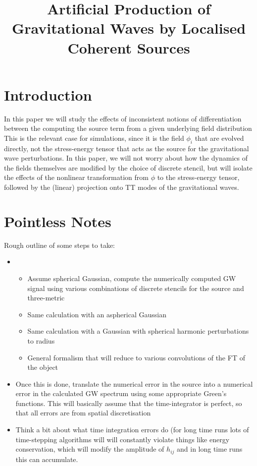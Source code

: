 \documentclass{revtex4}
\title{Artificial Production of Gravitational Waves by Localised Coherent Sources}
\begin{document}
\maketitle

\section{Introduction}
In this paper we will study the effects of inconsistent notions of differentiation between the computing the source term from a given underlying field distribution
This is the relevant case for simulations, since it is the field $\phi_i$ that are evolved directly, not the stress-energy tensor that acts as the source for the gravitational wave perturbations.
In this paper, we will not worry about how the dynamics of the fields themselves are modified by the choice of discrete stencil, but will isolate the effects of the nonlinear transformation from $\phi$ to the stress-energy tensor, followed by the (linear) projection onto TT modes of the gravitational waves.

\section{Pointless Notes}
Rough outline of some steps to take:
\begin{itemize}
\item
  \begin{itemize}
  \item Assume spherical Gaussian, compute the numerically computed GW signal using various combinations of discrete stencils for the source and three-metric
  \item Same calculation with an aspherical Gaussian
  \item Same calculation with a Gaussian with spherical harmonic perturbations to radius
  \item General formalism that will reduce to various convolutions of the FT of the object
  \end{itemize}
\item Once this is done, translate the numerical error in the source into a numerical error in the calculated GW spectrum using some appropriate Green's functions.  This will basically assume that the time-integrator is perfect, so that all errors are from spatial discretisation
\item Think a bit about what time integration errors do (for long time runs lots of time-stepping algorithms will will constantly violate things like energy conservation, which will modify the amplitude of $h_{ij}$ and in long time runs this can accumulate.
\end{itemize}
\end{document}
